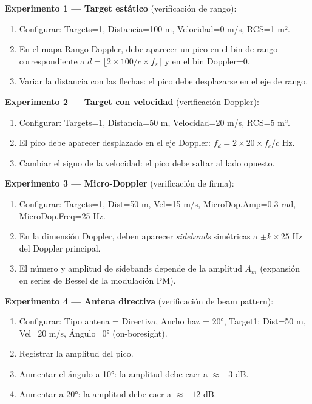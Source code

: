 \documentclass[11pt,a4paper]{article}
\begin{document}
\textbf{Experimento 1 — Target estático} (verificación de rango):
\begin{enumerate}
  \item Configurar: Targets=1, Distancia=100 m, Velocidad=0 m/s, RCS=1 m².
  \item En el mapa Rango-Doppler, debe aparecer un pico en el bin de rango
        correspondiente a $d = \lfloor 2 \times 100 / c \times f_s \rceil$
        y en el bin Doppler=0.
  \item Variar la distancia con las flechas: el pico debe desplazarse en el eje de rango.
\end{enumerate}

\textbf{Experimento 2 — Target con velocidad} (verificación Doppler):
\begin{enumerate}
  \item Configurar: Targets=1, Distancia=50 m, Velocidad=20 m/s, RCS=5 m².
  \item El pico debe aparecer desplazado en el eje Doppler:
        $f_d = 2 \times 20 \times f_c / c$ Hz.
  \item Cambiar el signo de la velocidad: el pico debe saltar al lado opuesto.
\end{enumerate}

\textbf{Experimento 3 — Micro-Doppler} (verificación de firma):
\begin{enumerate}
  \item Configurar: Targets=1, Dist=50 m, Vel=15 m/s, MicroDop.Amp=0.3 rad,
        MicroDop.Freq=25 Hz.
  \item En la dimensión Doppler, deben aparecer \textit{sidebands} simétricas
        a $\pm k \times 25$ Hz del Doppler principal.
  \item El número y amplitud de sidebands depende de la amplitud $A_m$
        (expansión en series de Bessel de la modulación PM).
\end{enumerate}

\textbf{Experimento 4 — Antena directiva} (verificación de beam pattern):
\begin{enumerate}
  \item Configurar: Tipo antena = Directiva, Ancho haz = 20°,
        Target1: Dist=50 m, Vel=20 m/s, Ángulo=0° (on-boresight).
  \item Registrar la amplitud del pico.
  \item Aumentar el ángulo a 10°: la amplitud debe caer a $\approx -3$ dB.
  \item Aumentar a 20°: la amplitud debe caer a $\approx -12$ dB.
\end{enumerate}
\end{document}
